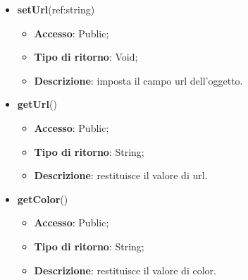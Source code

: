 {{\begin{itemize}
\begin{itemize}
				\item \textbf{Tipo di ritorno}: Void;
				\item \textbf{Descrizione}: imposta il campo color dell’oggetto.
			\end{itemize}
			\item \textbf{setUrl}(ref:string)
			\begin{itemize}
				\item \textbf{Accesso}: Public;
				\item \textbf{Tipo di ritorno}: Void;
				\item \textbf{Descrizione}: imposta il campo url dell’oggetto.
			\end{itemize}
			\item \textbf{getUrl}()
			\begin{itemize}
				\item \textbf{Accesso}: Public;
				\item \textbf{Tipo di ritorno}: String;
				\item \textbf{Descrizione}: restituisce il valore di url.
			\end{itemize}
			\item \textbf{getColor}()
			\begin{itemize}
				\item \textbf{Accesso}: Public;
				\item \textbf{Tipo di ritorno}: String;
				\item \textbf{Descrizione}: restituisce il valore di color.
			\end{itemize}
		\end{itemize}
		}
	}
